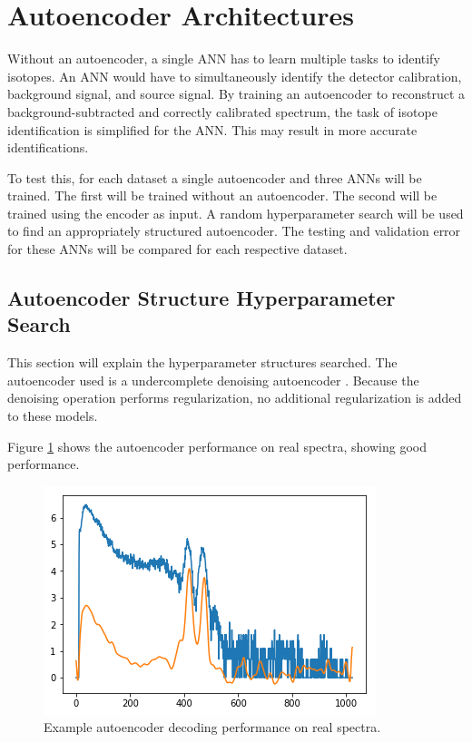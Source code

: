 \section{Autoencoder Architectures}

Without an autoencoder, a single ANN has to learn multiple tasks to identify isotopes. An ANN would have to simultaneously identify the detector calibration, background signal, and source signal. By training an autoencoder to reconstruct a background-subtracted and correctly calibrated spectrum, the task of isotope identification is simplified for the ANN. This may result in more accurate identifications. 




To test this, for each dataset a single autoencoder and three ANNs will be trained. The first will be trained without an autoencoder. The second will be trained using the encoder as input. A random hyperparameter search will be used to find an appropriately structured autoencoder. The testing and validation error for these ANNs will be compared for each respective dataset.

\subsection{Autoencoder Structure Hyperparameter Search}

This section will explain the hyperparameter structures searched. The autoencoder used is a undercomplete denoising autoencoder \cite{Goodfellow-et-al-2016}. Because the denoising operation performs regularization, no additional regularization is added to these models.


Figure \ref{fig:autoencoder_real_spectra} shows the autoencoder performance on real spectra, showing good performance.

\begin{figure}[H]
	\centering
	\includegraphics[width=0.8\linewidth]{images/bscae_example.png}
	\caption{Example autoencoder decoding performance on real spectra.}
	\label{fig:autoencoder_real_spectra}
\end{figure}


